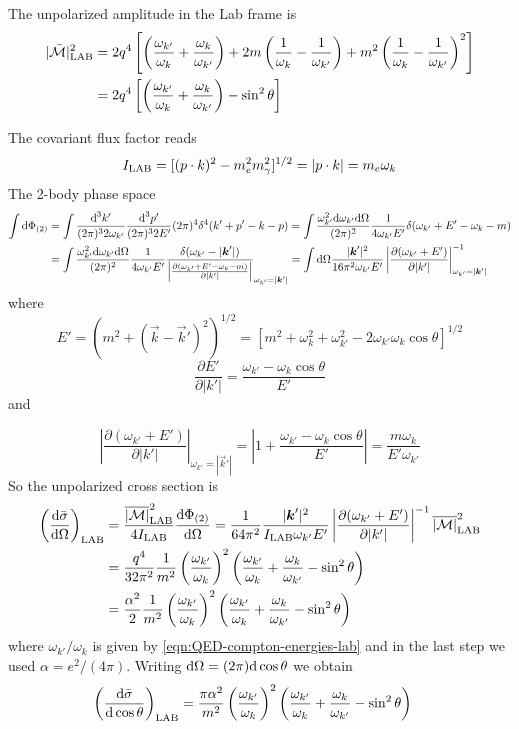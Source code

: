 \documentclass[TheoreticalPhy_ModB.tex]{subfiles}
\begin{document}
The unpolarized amplitude in the Lab frame is
\begin{align*}
|\bar{\mathcal M}|_{\textup{LAB}}^2&=2q^4\left[\left(\frac{\omega_{k'}}{\omega_k}+\frac{\omega_k}{\omega_{k'}}\right)+2m\left(\frac1{\omega_k}-\frac1{\omega_{k'}}\right)+m^2\left(\frac1{\omega_k}-\frac1{\omega_{k'}}\right)^2\right]\\
&=2q^4\left[\left(\frac{\omega_{k'}}{\omega_k}+\frac{\omega_k}{\omega_{k'}}\right)-\sin^2\theta\right]
\end{align*}

The covariant flux factor reads
\[I_{\textup{LAB}}=[(p\cdot k)^2-m_e^2m_\gamma^2]^{1/2}=|p\cdot k|=m_e\omega_k\]
The 2-body phase space
\begin{align*}
\int\textup{d}\Phi_{(2)}&=\int \frac{\textup{d}^3k'}{(2\pi)^32\omega_{k'}}\frac{\textup{d}^3p'}{(2\pi)^32E'}(2\pi)^4\delta^4(k'+p'-k-p)
=\int\frac{\omega^2_{k'}\textup{d}\omega_{k'}\textup{d}\Omega}{(2\pi)^2}\frac{1}{4\omega_{k'}E'}\delta(\omega_{k'}+E'-\omega_k-m)\\
&=\int\frac{\omega^2_{k'}\textup{d}\omega_{k'}\textup{d}\Omega}{(2\pi)^2}\frac{1}{4\omega_{k'}E'}\frac{\delta(\omega_{k'}-|\boldsymbol k'|)}{\left|\frac{\partial(\omega_{k'}+E'-\omega_k-m)}{\partial|k'|}\right|}_{\omega_{k'}=|\boldsymbol k'|}
=\int\textup{d}\Omega\frac{|\boldsymbol k'|^2}{16\pi^2\omega_{k'}E'}\left|\frac{\partial(\omega_{k'}+E')}{\partial|k'|}\right|^{-1}_{\omega_{k'}=|\boldsymbol k'|}
\end{align*}
where 
\[E'=\left(m^2+(\vec k-\vec k')^2\right)^{1/2}
=\left[m^2+\omega_k^2+\omega_{k'}^2-2\omega_{k'}\omega_k\cos\theta\right]^{1/2}\]
\[\frac{\partial E'}{\partial|k'|}=\frac{\omega_{k'}-\omega_k\cos\theta}{E'}\]
and

\[\left|\frac{\partial(\omega_{k'}+E')}{\partial|k'|}\right|_{\omega_{k'}=|\vec k'|}
=\left|1+\frac{\omega_{k'}-\omega_k\cos\theta}{E'}\right|
=\frac{m\omega_k}{E'\omega_{k'}}
\]
So the unpolarized cross section is 
\begin{align*}
\left(\frac{\textup{d}\bar\sigma}{\textup{d}\Omega}\right)_{\textup{LAB}}&=
\frac{\overline{|\mathcal M|}_{\textup{LAB}}^2}{4I_{\textup{LAB}}}\frac{\textup{d}\Phi_{(2)}}{\textup{d}\Omega}
=\frac1{64\pi^2}\frac{|\boldsymbol k'|^2}{I_{\textup{LAB}}\omega_{k'}E'}\left|\frac{\partial(\omega_{k'}+E')}{\partial|k'|}\right|^{-1}\overline{|\mathcal M|}_{\textup{LAB}}^2\\
&=\frac{q^4}{32\pi^2}\frac1{m^2}\left(\frac{\omega_{k'}}{\omega_k}\right)^2\left(\frac{\omega_{k'}}{\omega_k}+\frac{\omega_k}{\omega_{k'}}-\sin^2\theta\right)\\
&=\frac{\alpha^2}{2}\frac1{m^2}\left(\frac{\omega_{k'}}{\omega_k}\right)^2\left(\frac{\omega_{k'}}{\omega_k}+\frac{\omega_k}{\omega_{k'}}-\sin^2\theta\right)
\end{align*}
where $\omega_{k'}/\omega_{k}$ is given by \eqref{eqn:QED-compton-energies-lab} and in the last step we used $\alpha=e^2/(4\pi)$. Writing $\textup{d}\Omega=(2\pi)\textup{d}\cos\theta$ we obtain
\begin{align}\label{eqn:Klein-Nishina}
\left(\frac{\textup{d}\bar\sigma}{\textup{d}\cos\theta}\right)_{\textup{LAB}}&=
\frac{\pi\alpha^2}{m^2}\left(\frac{\omega_{k'}}{\omega_k}\right)^2\left(\frac{\omega_{k'}}{\omega_k}+\frac{\omega_k}{\omega_{k'}}-\sin^2\theta\right)
\end{align}
\end{document}
